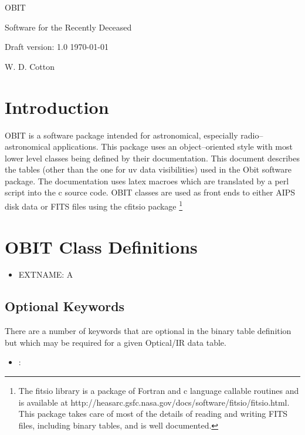 \documentclass[11pt]{article}
\begin{document}
\setcounter{section}{0}

\vskip 5cm
\centerline{\ttlfont OBIT}
\vskip 1cm
\centerline{\ttlfont Software for the Recently Deceased}
\vskip 3cm
\centerline{\secfont Draft version: 1.0 \today}
\vskip 1cm
\centerline{\secfont W. D. Cotton}
\clearpage

\tableofcontents
\cleardoublepage

\section {Introduction}
OBIT is a software package intended for astronomical, especially
radio--astronomical applications. 
This package uses an object--oriented style with most lower level
classes being defined by their documentation.
This document describes the tables (other than the one for uv data
visibilities) used in the Obit software package.
The documentation uses latex macroes which are translated by a perl
script into the c source code.
OBIT classes are used as front ends to either AIPS disk data or FITS
files using the  cfitsio package
\footnote{The fitsio library is a package of Fortran and c language
callable routines and is available at 
http://heasarc.gsfc.nasa.gov/docs/software/fitsio/fitsio.html.
This package takes care of most of the details of reading and writing
FITS files, including binary tables, and is well documented.}

\clearpage
\section {OBIT Class Definitions}
\begin{itemize}
\item{EXTNAME:}{ A\hfill\break}
\end{itemize}
\subsection{Optional Keywords}
There are a number of keywords that are optional in the binary table
definition but which may be required for a given Optical/IR data table.
\begin{itemize}
\item{:}{ \hfill\break}
\end{itemize}

\clearpage
%
\begin{ObitEnum}
\end{ObitEnum}
\end{document}
